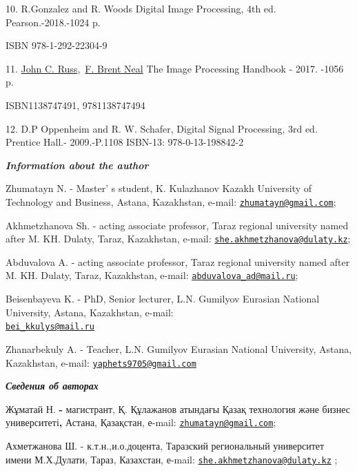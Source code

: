 \begin{references}
10. R.Gonzalez and R. Woods Digital Image Processing, 4th ed.
Pearson.-2018.-1024 p.

ISBN 978-1-292-22304-9

11.
\href{https://www.google.kz/search?hl=ru&tbo=p&tbm=bks&q=inauthor:\%22John+C.+Russ\%22}{John
C.
Russ},~\href{https://www.google.kz/search?hl=ru&tbo=p&tbm=bks&q=inauthor:\%22F.+Brent+Neal\%22}{F.
Brent Neal} The Image Processing Handbook - 2017. -1056 p.

ISBN1138747491, 9781138747494

12. D.P Oppenheim and R. W. Schafer, Digital Signal Processing, 3rd ed.
Prentice Hall.- 2009.-P.1108 ISBN-13: 978-0-13-198842-2
\end{references}

\begin{authorinfo}
\emph{{\bfseries Information about the author}}

Zhumatayn N. - Master' s student, K. Kulazhanov Kazakh
University of Technology and Business, Astana, Kazakhstan, e-mail:
\href{mailto:zhumatayn@gmail.com}{\nolinkurl{zhumatayn@gmail.com}};

Akhmetzhanova Sh. - acting associate professor, Taraz regional
university named after M. KH. Dulaty, Taraz, Kazakhstan, e-mail:
\href{mailto:she.akhmetzhanova@dulaty.kz}{\nolinkurl{she.akhmetzhanova@dulaty.kz}};

Abduvalova A. - acting associate professor, Taraz regional university
named after M. KH. Dulaty, Taraz, Kazakhstan, e-mail:
\href{mailto:abduvalova_ad@mail.ru}{\nolinkurl{abduvalova\_ad@mail.ru}};

Beisenbayeva K. - PhD, Senior lecturer, L.N. Gumilyov Eurasian National
University, Astana, Kazakhstan, e-mail:\\
\href{mailto:bei_kkulys@mail.ru}{\nolinkurl{bei\_kkulys@mail.ru}}

Zhanarbekuly A. - Teacher, L.N. Gumilyov Eurasian National University,
Astana, Kazakhstan, e-mail:
\href{mailto:yaphets9705@gmail.com}{\nolinkurl{yaphets9705@gmail.com}}

\emph{{\bfseries Сведения об авторах}}

Жұматай Н. {\bfseries -} магистрант, Қ. Құлажанов атындағы Қазақ технология
және бизнес университеті{\bfseries ,} Астана, Қазақстан, е-mail:
\href{mailto:zhumatayn@gmail.com}{\nolinkurl{zhumatayn@gmail.com}};

Ахметжанова Ш. - к.т.н.,и.о.доцента, Таразский региональный университет
имени М.Х.Дулати, Тараз, Казахстан, е-mail:
\href{mailto:she.akhmetzhanova@dulaty.kz}{\nolinkurl{she.akhmetzhanova@dulaty.kz}}
;


\end{authorinfo}
